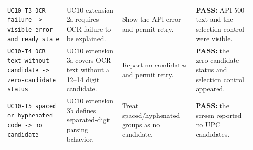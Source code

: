 \documentclass[sigconf]{acmart}
\begin{document}
\begin{table}[!p]
\begin{tabular}{@{}L{0.26\textwidth}L{0.21\textwidth}L{0.20\textwidth}L{0.27\textwidth}@{}}
    \texttt{UC10-T3 OCR failure -> visible error and ready state}
      & UC10 extension 2a requires OCR failure to be explained.
      & Show the API error and permit retry.
      & \textbf{PASS:} API 500 text and the selection control were visible. \\
    \texttt{UC10-T4 OCR text without candidate -> zero-candidate status}
      & UC10 extension 3a covers OCR text without a 12--14 digit candidate.
      & Report no candidates and permit retry.
      & \textbf{PASS:} the zero-candidate status and selection control appeared. \\
    \texttt{UC10-T5 spaced or hyphenated code -> no candidate}
      & UC10 extension 3b defines separated-digit parsing behavior.
      & Treat spaced/hyphenated groups as no candidate.
      & \textbf{PASS:} the screen reported no UPC candidates. \\
    \bottomrule
  \end{tabular}
\end{table}
\end{document}
